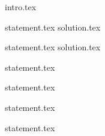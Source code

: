 {intro.tex}

{statement.tex}
{solution.tex}

{statement.tex}
{solution.tex}

{statement.tex}

{statement.tex}

{statement.tex}

{statement.tex}